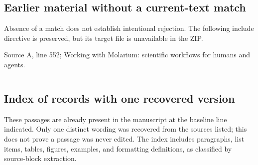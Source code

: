 \documentclass[11pt]{article}
\begin{document}
\subsection{Earlier material without a current-text match}

Absence of a match does not establish intentional rejection. The following include directive is preserved, but its target file is unavailable in the ZIP.

Source A, line 552; Working with Molarium: scientific workflows for humans and agents.

\begin{lstlisting}

\end{lstlisting}

\subsection{Index of records with one recovered version}

These passages are already present in the manuscript at the baseline line indicated. Only one distinct wording was recovered from the sources listed; this does not prove a passage was never edited. The index includes paragraphs, list items, tables, figures, examples, and formatting definitions, as classified by source-block extraction.
\end{document}
